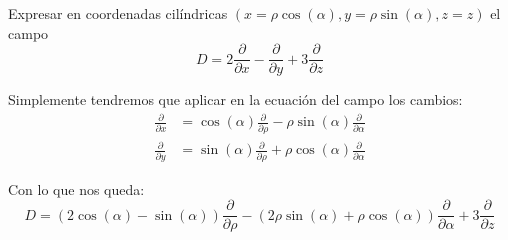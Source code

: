 \begin{problem}[7]
Expresar en coordenadas cilíndricas $(x=ρ\cos(α), y=ρ\sin(α), z=z)$ el campo
\[D= 2 \frac{\partial}{\partial x}-\frac{\partial}{\partial y}+3\frac{\partial}{\partial z}\]

\solution
\yoP

Simplemente tendremos que aplicar en la ecuación del campo los cambios:
\begin{align}
\frac{\partial}{\partial x} &= \cos(α)\frac{\partial}{\partial ρ}-ρ\sin(α)\frac{\partial}{\partial α} \\
\frac{\partial}{\partial y} &= \sin(α)\frac{\partial}{\partial ρ}+ρ\cos(α)\frac{\partial}{\partial α}
\end{align}

Con lo que nos queda:
\[D=(2\cos(α)-\sin(α))\frac{\partial}{\partial ρ}-(2ρ\sin(α)+ρ\cos(α))\frac{\partial}{\partial α}+3\frac{\partial}{\partial z}\]

\end{problem}


